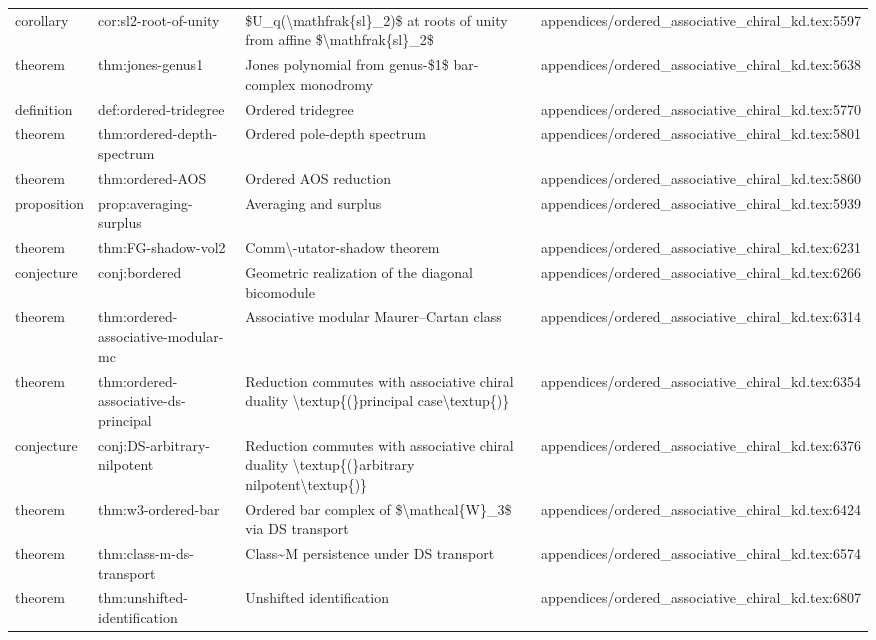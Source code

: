 \documentclass[11pt]{article}
\begin{document}
\begin{longtable}{L{0.10\textwidth}L{0.26\textwidth}L{0.42\textwidth}L{0.22\textwidth}}
corollary & cor:sl2-root-of-unity & \$U\_q(\textbackslash{}mathfrak\{sl\}\_2)\$ at roots of unity from affine \$\textbackslash{}mathfrak\{sl\}\_2\$ & appendices/ordered\_associative\_chiral\_kd.tex:5597\\
theorem & thm:jones-genus1 & Jones polynomial from genus-\$1\$ bar-complex monodromy & appendices/ordered\_associative\_chiral\_kd.tex:5638\\
definition & def:ordered-tridegree & Ordered tridegree & appendices/ordered\_associative\_chiral\_kd.tex:5770\\
theorem & thm:ordered-depth-spectrum & Ordered pole-depth spectrum & appendices/ordered\_associative\_chiral\_kd.tex:5801\\
theorem & thm:ordered-AOS & Ordered AOS reduction & appendices/ordered\_associative\_chiral\_kd.tex:5860\\
proposition & prop:averaging-surplus & Averaging and surplus & appendices/ordered\_associative\_chiral\_kd.tex:5939\\
theorem & thm:FG-shadow-vol2 & Comm\textbackslash{}-utator-shadow theorem & appendices/ordered\_associative\_chiral\_kd.tex:6231\\
conjecture & conj:bordered & Geometric realization of the diagonal bicomodule & appendices/ordered\_associative\_chiral\_kd.tex:6266\\
theorem & thm:ordered-associative-modular-mc & Associative modular Maurer--Cartan class & appendices/ordered\_associative\_chiral\_kd.tex:6314\\
theorem & thm:ordered-associative-ds-principal & Reduction commutes with associative chiral duality \textbackslash{}textup\{(\}principal case\textbackslash{}textup\{)\} & appendices/ordered\_associative\_chiral\_kd.tex:6354\\
conjecture & conj:DS-arbitrary-nilpotent & Reduction commutes with associative chiral duality \textbackslash{}textup\{(\}arbitrary nilpotent\textbackslash{}textup\{)\} & appendices/ordered\_associative\_chiral\_kd.tex:6376\\
theorem & thm:w3-ordered-bar & Ordered bar complex of \$\textbackslash{}mathcal\{W\}\_3\$ via DS transport & appendices/ordered\_associative\_chiral\_kd.tex:6424\\
theorem & thm:class-m-ds-transport & Class\textasciitilde{}M persistence under DS transport & appendices/ordered\_associative\_chiral\_kd.tex:6574\\
theorem & thm:unshifted-identification & Unshifted identification & appendices/ordered\_associative\_chiral\_kd.tex:6807\\

\end{longtable}
\end{document}
